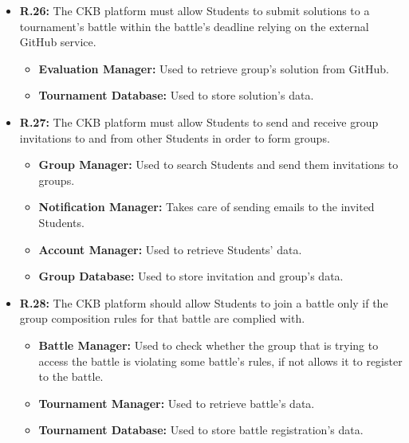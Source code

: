 \documentclass{article}
\begin{document}
{\begin{itemize}
\begin{itemize}
              registration deadline has not expired yet.
              \item \textbf{Tournament Manager:} Used to retrieve battle's data.
              \item \textbf{Tournament Database:} Used to store Student's registration to the battle.
          \end{itemize}
    \item \textbf{R.26:} The CKB platform must allow Students to submit solutions to a tournament's battle
        within the battle's deadline relying on the external GitHub service.
          \begin{itemize}
              \item \textbf{Evaluation Manager:} Used to retrieve group's solution from GitHub.
              \item \textbf{Tournament Database:} Used to store solution's data.
          \end{itemize}
    \item \textbf{R.27:} The CKB platform must allow Students to send and receive group invitations to and from
          other Students in order to form groups.
          \begin{itemize}
              \item \textbf{Group Manager:} Used to search Students and send them invitations to groups.
              \item \textbf{Notification Manager:} Takes care of sending emails to the invited Students.
              \item \textbf{Account Manager:} Used to retrieve Students' data.
              \item \textbf{Group Database:} Used to store invitation and group's data.
          \end{itemize}
    \item \textbf{R.28:} The CKB platform should allow Students to join a battle only if the group composition rules
          for that battle are complied with.
          \begin{itemize}
              \item \textbf{Battle Manager:} Used to check whether the group that is trying to
              access the battle is violating some battle's rules, if not allows it to register to
              the battle.
              \item \textbf{Tournament Manager:} Used to retrieve battle's data.
              \item \textbf{Tournament Database:} Used to store battle registration's data.

\end{itemize}
\end{itemize}}
\end{document}
